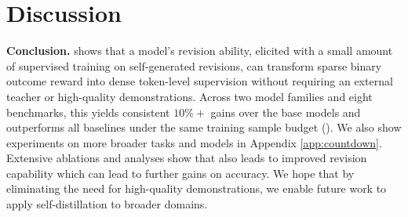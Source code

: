 


\section{Discussion}
\label{sec:discussion}


 \textbf{Conclusion.} \ours{} shows that a model’s revision ability, elicited with a small amount of supervised training on self-generated revisions, can transform sparse binary outcome reward into dense token-level supervision without requiring an external teacher or high-quality demonstrations. 
Across two model families and eight benchmarks, this yields consistent \(10\%+\) gains over the base models and outperforms all baselines under the same training sample budget (). 
We also show experiments on more broader tasks and models in Appendix \ref{app:countdown}. 
Extensive ablations and analyses show that \ours{} also leads to improved revision capability which can lead to further gains on accuracy.
We hope that by eliminating the need for high-quality demonstrations, we enable future work to apply self-distillation to broader domains.


